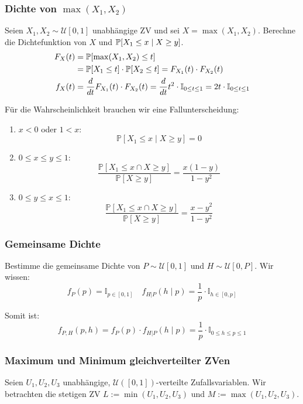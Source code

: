 \subsubsection*{\texorpdfstring{Dichte von \(\max(X_1,X_2)\)}{Dichte von max()}}

Seien \(X_1, X_2 \sim \mathcal{U}[0,1]\) unabhängige ZV und sei \(X = \max (X_1, X_2)\). Berechne die Dichtefunktion von \(X\) und \(\P[X_1 \leq x \mid X \geq y]\).
\begin{align*}
	F_X(t) & = \P[\max(X_1, X_2) \leq t]                                                                                                              \\ &= \P[X_1 \leq t] \cdot \P[X_2 \leq t] = F_{X_1}(t) \cdot F_{X_2}(t) \\
	f_X(t) & = \frac{d}{dt} F_{X_1}(t) \cdot F_{X_2}(t) = \frac{d}{dt} t^2 \cdot \mathbb{I}_{0 \leq t \leq 1} = 2t \cdot \mathbb{I}_{0 \leq t \leq 1}
\end{align*}

Für die Wahrscheinlichkeit brauchen wir eine Fallunterscheidung: \smallskip

\begin{enumerate}
	\item \(x < 0\) oder \(1 < x\):
	      \[\mathbb{P}[X_1 \leq x \mid X \geq y] = 0\]
	\item \(0 \leq x \leq y \leq 1\):
	      \[\frac{\mathbb{P}[X_1 \leq x \cap X \geq y]}{\mathbb{P}[X \geq y]} = \frac{x(1-y)}{1 - y^2}\]
	\item \(0 \leq y \leq x \leq 1\):
	      \[\frac{\mathbb{P}[X_1 \leq x \cap X \geq y]}{\mathbb{P}[X \geq y]} = \frac{x - y^2}{1 - y^2}\]
\end{enumerate}

\subsubsection*{Gemeinsame Dichte}

Bestimme die gemeinsame Dichte von \(P \sim \mathcal{U}[0,1]\) und \(H \sim \mathcal{U}[0,P]\). Wir wissen:
\[f_P(p) = \mathbb I_{p \in [0,1]} \quad f_{H | P}(h \mid p) = \frac{1}{p} \cdot \mathbb{I}_{h \in [0,p]}\]

\noindent
Somit ist:
\[f_{P, H} (p, h) = f_P(p) \cdot f_{H | P}(h \mid p) = \frac{1}{p} \cdot \mathbb I_{0 \leq h \leq p \leq 1}\]

\subsubsection*{Maximum und Minimum gleichverteilter ZVen}
Seien $U_1, U_2, U_3$ unabhängige, $\mathcal{U}([0,1])$-verteilte Zufallsvariablen. 
Wir betrachten die stetigen ZV $L := \min(U_1, U_2, U_3)$ und $M:=\max(U_1, U_2, U_3)$.

